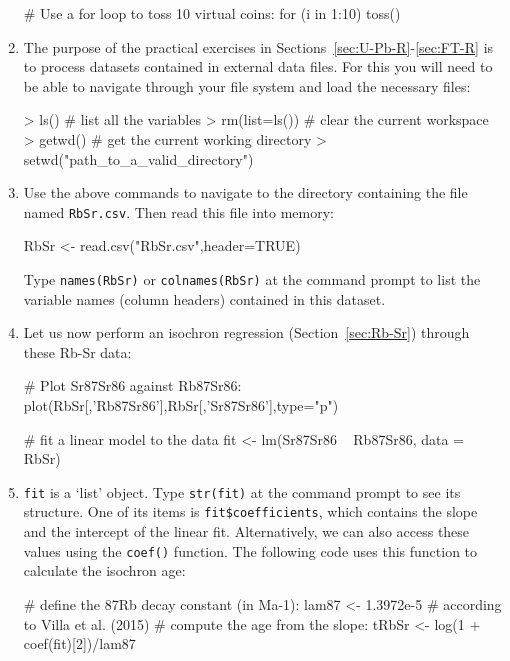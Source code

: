 \begin{enumerate}
\begin{script}
# Use a for loop to toss 10 virtual coins:
for (i in 1:10) {
    toss()
}
\end{script}

\item The purpose of the practical exercises in
  Sections~\ref{sec:U-Pb-R}-\ref{sec:FT-R} is to process datasets
  contained in external data files. For this you will need to be able
  to navigate through your file system and load the necessary files:

\begin{console}
> ls()          # list all the variables
> rm(list=ls()) # clear the current workspace
> getwd()       # get the current working directory
> setwd("path_to_a_valid_directory")
\end{console}

\item Use the above commands to navigate to the directory containing the
file named \texttt{RbSr.csv}. Then read this file into memory:

\begin{script}
RbSr <- read.csv("RbSr.csv",header=TRUE)
\end{script}

Type \texttt{names(RbSr)} or \texttt{colnames(RbSr)} at the command
prompt to list the variable names (column headers) contained in this
dataset.

\item Let us now perform an isochron regression
  (Section~\ref{sec:Rb-Sr}) through these Rb-Sr data: \label{itm:lm}

\begin{script}[firstnumber=2]
# Plot Sr87Sr86 against Rb87Sr86:
plot(RbSr[,'Rb87Sr86'],RbSr[,'Sr87Sr86'],type="p")

# fit a linear model to the data
fit <- lm(Sr87Sr86 ~ Rb87Sr86, data = RbSr)
\end{script}

\item \texttt{fit} is a `list' object. Type \texttt{str(fit)} at the
  command prompt to see its structure. One of its items is
  \verb|fit$coefficients|, which contains the slope and the intercept
  of the linear fit. Alternatively, we can also access these values
  using the \texttt{coef()} function. The following code uses this
  function to calculate the isochron age:

\begin{script}[firstnumber=7]
# define the 87Rb decay constant (in Ma-1):
lam87 <- 1.3972e-5 # according to Villa et al. (2015)
# compute the age from the slope:
tRbSr <- log(1 + coef(fit)[2])/lam87


\end{script}
\end{enumerate}
